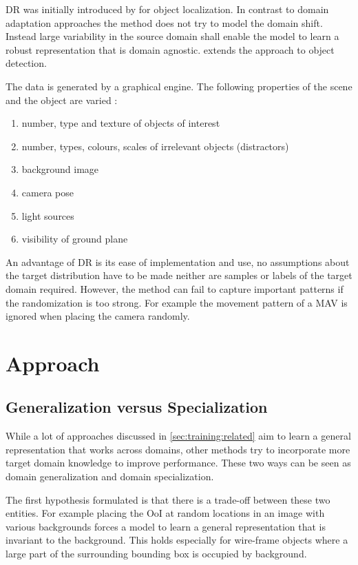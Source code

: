 \ac{DR} was initially introduced by \cite{Tobin2017} for object localization. In contrast to domain adaptation approaches the method does not try to model the domain shift. Instead large variability in the source domain shall enable the model to learn a robust representation that is domain agnostic. \cite{Tremblay2018a} extends the approach to object detection.

The data is generated by a graphical engine. The following properties of the scene and the object are varied \cite{Tremblay2018a}:

\begin{enumerate}
	\item number, type and texture of objects of interest
	\item number, types, colours, scales of irrelevant objects (distractors)
	\item background image
	\item camera pose
	\item light sources
	\item visibility of ground plane
\end{enumerate}

An advantage of \ac{DR} is its ease of implementation and use, no assumptions about the target distribution have to be made neither are samples or labels of the target domain required. However, the method can fail to capture important patterns if the randomization is too strong. For example the movement pattern of a \ac{MAV} is ignored when placing the camera randomly.
 
\section{Approach}
\label{sec:training:hypothesis}

\subsection{Generalization versus Specialization}

While a lot of approaches discussed in \autoref{sec:training:related} aim to learn a general representation that works across domains, other methods try to incorporate more target domain knowledge to improve performance. These two ways can be seen as domain generalization and domain specialization. 

The first hypothesis formulated is that there is a trade-off between these two entities. For example placing the \ac{OoI} at random locations in an image with various backgrounds forces a model to learn a general representation that is invariant to the background. This holds especially for wire-frame objects where a large part of the surrounding bounding box is occupied by background. 

